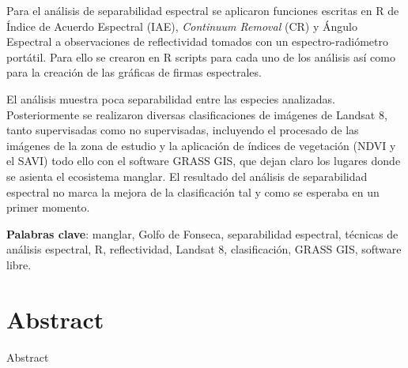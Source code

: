 Para el análisis de separabilidad espectral se aplicaron funciones escritas en R de Índice de Acuerdo Espectral (IAE), \textit{Continuum Removal} (CR) y Ángulo Espectral a observaciones de reflectividad tomados con un espectro-radiómetro portátil. Para ello se crearon en R scripts para cada uno de los análisis así como para la creación de las gráficas de firmas espectrales.

El análisis muestra poca separabilidad entre las especies analizadas. Posteriormente se realizaron diversas clasificaciones de imágenes de Landsat 8, tanto supervisadas como no supervisadas, incluyendo el procesado de las imágenes de la zona de estudio y la aplicación de índices de vegetación (NDVI y el SAVI) todo ello con el software GRASS GIS, que dejan claro los lugares donde se asienta el ecosistema manglar. El resultado del análisis de separabilidad espectral no marca la mejora de la clasificación tal y como se esperaba en un primer momento.

\noindent\textbf{Palabras clave}: manglar, Golfo de Fonseca, separabilidad espectral, técnicas de análisis espectral, R, reflectividad, Landsat 8, clasificación, GRASS GIS, software libre.

\section*{Abstract}
Abstract